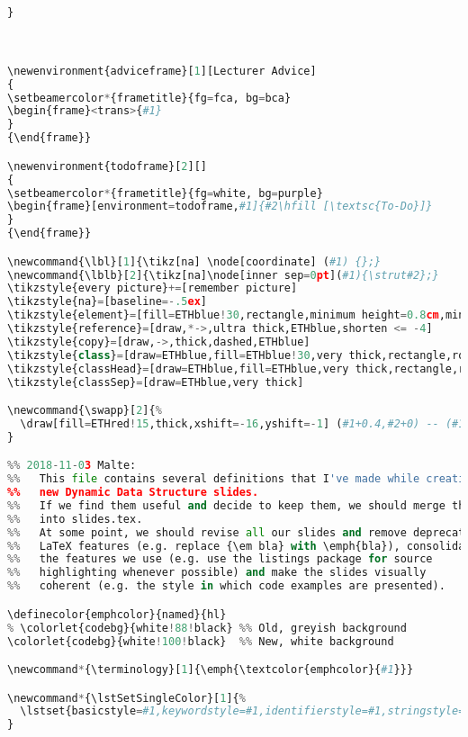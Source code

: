 {\begin{lstlisting}[language=Python,style=normal,escapechar=?,morekeywords={True, False}, mathescape]
}



\newenvironment{adviceframe}[1][Lecturer Advice]
{
\setbeamercolor*{frametitle}{fg=fca, bg=bca}
\begin{frame}<trans>{#1}
}
{\end{frame}}

\newenvironment{todoframe}[2][]
{
\setbeamercolor*{frametitle}{fg=white, bg=purple}
\begin{frame}[environment=todoframe,#1]{#2\hfill [\textsc{To-Do}]}
}
{\end{frame}}

\newcommand{\lbl}[1]{\tikz[na] \node[coordinate] (#1) {};}
\newcommand{\lblb}[2]{\tikz[na]\node[inner sep=0pt](#1){\strut#2};}
\tikzstyle{every picture}+=[remember picture]
\tikzstyle{na}=[baseline=-.5ex]
\tikzstyle{element}=[fill=ETHblue!30,rectangle,minimum height=0.8cm,minimum width=0.8cm]
\tikzstyle{reference}=[draw,*->,ultra thick,ETHblue,shorten <= -4]
\tikzstyle{copy}=[draw,->,thick,dashed,ETHblue]
\tikzstyle{class}=[draw=ETHblue,fill=ETHblue!30,very thick,rectangle,rounded corners] 
\tikzstyle{classHead}=[draw=ETHblue,fill=ETHblue,very thick,rectangle,rounded corners]
\tikzstyle{classSep}=[draw=ETHblue,very thick]

\newcommand{\swapp}[2]{%
  \draw[fill=ETHred!15,thick,xshift=-16,yshift=-1] (#1+0.4,#2+0) -- (#1+0.7,#2+0) -- (#1+0.7,#2-0.05) -- (#1+0.8, #2+0.05) -- (#1+0.7,#2+0.15) -- (#1+0.7,#2+0.1) -- (#1+0.4,#2+0.1) -- (#1+0.4,#2+0.15) -- (#1+0.3,#2+0.05) -- (#1+0.4,#2-0.05) -- cycle;%
}

%% 2018-11-03 Malte:
%%   This file contains several definitions that I've made while creating the
%%   new Dynamic Data Structure slides.
%%   If we find them useful and decide to keep them, we should merge them
%%   into slides.tex.
%%   At some point, we should revise all our slides and remove deprecated 
%%   LaTeX features (e.g. replace {\em bla} with \emph{bla}), consolidate
%%   the features we use (e.g. use the listings package for source 
%%   highlighting whenever possible) and make the slides visually 
%%   coherent (e.g. the style in which code examples are presented).

\definecolor{emphcolor}{named}{hl}
% \colorlet{codebg}{white!88!black} %% Old, greyish background
\colorlet{codebg}{white!100!black}  %% New, white background

\newcommand*{\terminology}[1]{\emph{\textcolor{emphcolor}{#1}}}

\newcommand*{\lstSetSingleColor}[1]{%
  \lstset{basicstyle=#1,keywordstyle=#1,identifierstyle=#1,stringstyle=#1,commentstyle=#1}%
}


\end{lstlisting}}

